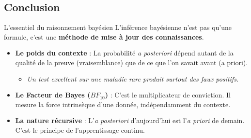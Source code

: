 \subsection{Conclusion}

\begin{frame}{L'essentiel du raisonnement bayésien}
	L'inférence bayésienne n'est pas qu'une formule, c'est une \textbf{méthode de mise à jour des connaissances}.
	\vspace{0.3cm}
	\begin{itemize}
		\item \textbf{Le poids du contexte} : La probabilité \textit{a posteriori} dépend autant de la qualité de la preuve (vraisemblance) que de ce que l'on savait avant (a priori). 
		\begin{itemize}
			\item[$\rightarrow$] \textit{Un test excellent sur une maladie rare produit surtout des faux positifs.}
		\end{itemize}
		\pause
		\item \textbf{Le Facteur de Bayes ($BF_{10}$)} : C'est le multiplicateur de conviction. Il mesure la force intrinsèque d'une donnée, indépendamment du contexte.
		\pause
		\item \textbf{La nature récursive} : L'\textit{a posteriori} d'aujourd'hui est l'\textit{a priori} de demain. C'est le principe de l'apprentissage continu.
	\end{itemize}
\end{frame}

